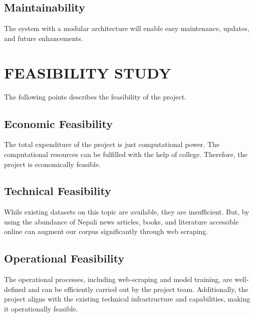             \subsection{Maintainability}            
            The system with a modular architecture will enable easy maintenance, updates, and future enhancements.


        \newpage        
        \section{FEASIBILITY STUDY}
            The following points describes the feasibility of the project.

            \subsection{Economic Feasibility}
                The total expenditure of the project is just computational power. The computational resources can be fulfilled with the help of college. Therefore, the project is economically feasible.

            \subsection{Technical Feasibility}
                While existing datasets on this topic are available, they are insufficient. But, by using the abundance of Nepali news articles, books, and literature accessible online can augment our corpus significantly through web scraping.

            \subsection{Operational Feasibility}
                The operational processes, including web-scraping and model training, are well-defined and can be efficiently carried out by the project team. Additionally, the project aligns with the existing technical infrastructure and capabilities, making it operationally feasible.